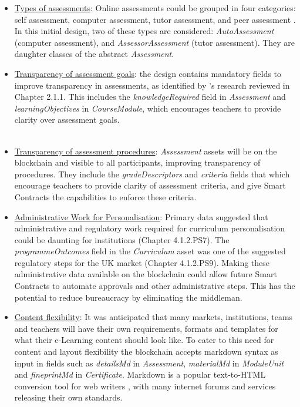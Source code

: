 \begin{itemize}
	\setlength\itemsep{0em}
	\item \underline{Types of assessments}: Online assessments could be grouped in four categories: 
		  self assessment, computer assessment, tutor assessment, and peer assessment
	      \citep[p.68]{paulsen2004online}. In this initial design, two of these types are considered: \textit{AutoAssessment} (computer
	      assessment), and \textit{AssessorAssessment} (tutor assessment). They are daughter classes of the abstract \textit{Assessment}.
	\item \underline{Transparency of assessment goals}: the design contains mandatory fields to improve transparency in assessments, as identified by
	      \citet{suhre2013determinants}'s research reviewed in Chapter 2.1.1. This includes the \textit{knowledgeRequired} field
	      in \textit{Assessment} and \textit{learningObjectives} in \textit{CourseModule}, which encourages teachers to provide
		  clarity over assessment goals. \\\\
	\item \underline{Transparency of assessment procedures}: \textit{Assessment} assets will be on the blockchain and visible to all participants,
	      improving transparency of procedures.
	      They include the \textit{gradeDescriptors} and \textit{criteria} fields that which encourage teachers to provide clarity of
	      assessment criteria, and give Smart Contracts the capabilities to enforce these criteria.
	\item \underline{Administrative Work for Personalisation}: Primary data suggested that administrative and regulatory work required for
		  curriculum personalisation could be daunting for institutions (Chapter 4.1.2.PS7). 
		  The \textit{programmeOutcomes} field in the \textit{Curriculum} asset was one of
	      the suggested regulatory steps for the UK market (Chapter 4.1.2.PS9). Making these administrative data available on the blockchain
	      could allow future Smart Contracts to automate approvals and other administrative steps. This has the potential to reduce
	      bureaucracy by eliminating the middleman.
	\item \underline{Content flexibility}: It was anticipated that many markets, institutions, teams and teachers
	      will have their own requirements, formats and templates for what their e-Learning content should look like. To cater to
	      this need for content and layout flexibility the blockchain accepts markdown syntax as input in fields such as
	      \textit{detailsMd} in \textit{Assessment}, \textit{materialMd} in \textit{ModuleUnit} and \textit{fineprintMd} in \textit{Certificate}.
	      Markdown is a popular text-to-HTML conversion tool for web writers \citep{gruber2004markdown}, with many internet forums and
	      services releasing their own standards.
\end{itemize}

